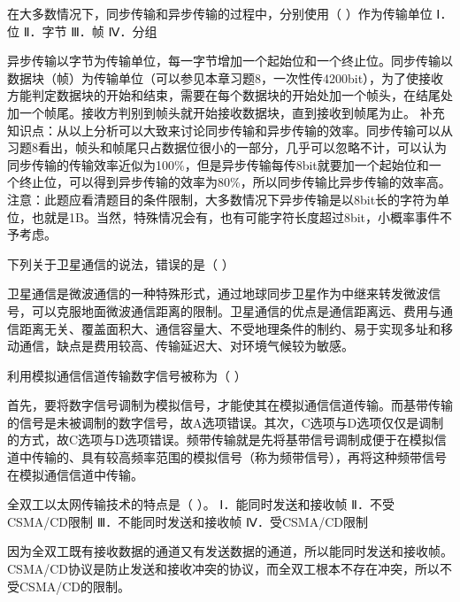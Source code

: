 \question 在大多数情况下，同步传输和异步传输的过程中，分别使用（ ）作为传输单位
Ⅰ．位 Ⅱ．字节 Ⅲ．帧 Ⅳ．分组
\par{}
\begin{solution}异步传输以字节为传输单位，每一字节增加一个起始位和一个终止位。同步传输以数据块（帧）为传输单位（可以参见本章习题8，一次性传4200bit），为了使接收方能判定数据块的开始和结束，需要在每个数据块的开始处加一个帧头，在结尾处加一个帧尾。接收方判别到帧头就开始接收数据块，直到接收到帧尾为止。
补充知识点：从以上分析可以大致来讨论同步传输和异步传输的效率。同步传输可以从习题8看出，帧头和帧尾只占数据位很小的一部分，几乎可以忽略不计，可以认为同步传输的传输效率近似为100\%，但是异步传输每传8bit就要加一个起始位和一个终止位，可以得到异步传输的效率为80\%，所以同步传输比异步传输的效率高。
注意：此题应看清题目的条件限制，大多数情况下异步传输是以8bit长的字符为单位，也就是1B。当然，特殊情况会有，也有可能字符长度超过8bit，小概率事件不予考虑。
\end{solution}
\question 下列关于卫星通信的说法，错误的是（ ）
\par{}
\begin{solution}卫星通信是微波通信的一种特殊形式，通过地球同步卫星作为中继来转发微波信号，可以克服地面微波通信距离的限制。卫星通信的优点是通信距离远、费用与通信距离无关、覆盖面积大、通信容量大、不受地理条件的制约、易于实现多址和移动通信，缺点是费用较高、传输延迟大、对环境气候较为敏感。
\end{solution}
\question 利用模拟通信信道传输数字信号被称为（ ）
\par{}
\begin{solution}首先，要将数字信号调制为模拟信号，才能使其在模拟通信信道传输。而基带传输的信号是未被调制的数字信号，故A选项错误。其次，C选项与D选项仅仅是调制的方式，故C选项与D选项错误。频带传输就是先将基带信号调制成便于在模拟信道中传输的、具有较高频率范围的模拟信号（称为频带信号），再将这种频带信号在模拟通信信道中传输。
\end{solution}
\question 全双工以太网传输技术的特点是（ ）。 Ⅰ．能同时发送和接收帧
Ⅱ．不受CSMA/CD限制 Ⅲ．不能同时发送和接收帧 Ⅳ．受CSMA/CD限制
\par{}
\begin{solution}因为全双工既有接收数据的通道又有发送数据的通道，所以能同时发送和接收帧。CSMA/CD协议是防止发送和接收冲突的协议，而全双工根本不存在冲突，所以不受CSMA/CD的限制。
\end{solution}
